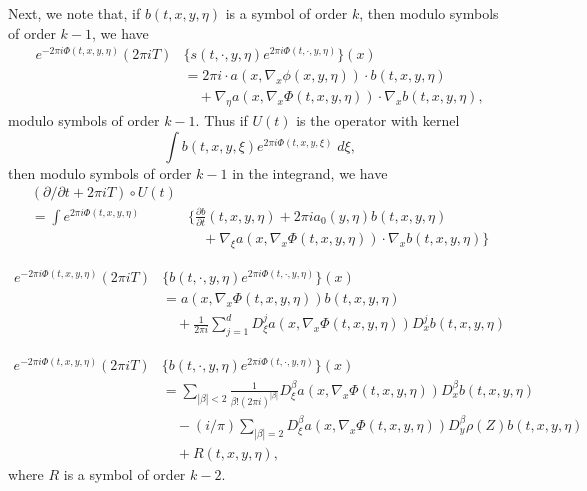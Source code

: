 Next, we note that, if $b(t,x,y,\eta)$ is a symbol of order $k$, then modulo symbols of order $k-1$, we have
%
\begin{align*}
    e^{-2 \pi i \Phi(t,x,y,\eta)} (2 \pi i T) & \{ s(t,\cdot,y,\eta) e^{2 \pi i \Phi(t,\cdot, y, \eta)} \}(x)\\
    &= 2 \pi i \cdot a(x, \nabla_x \phi(x,y,\eta)) \cdot b(t,x,y,\eta)\\
    &\quad + \nabla_\eta a(x, \nabla_x \Phi(t,x,y,\eta)) \cdot \nabla_x b(t,x,y,\eta),
\end{align*}
%
modulo symbols of order $k-1$. Thus if $U(t)$ is the operator with kernel
%
\[ \int b(t,x,y,\xi) e^{2 \pi i \Phi(t,x,y,\xi)}\; d\xi, \]
%
then modulo symbols of order $k-1$ in the integrand, we have
%
\begin{align*}
    (\partial / \partial t + 2 \pi i T) \circ U(t)\\
    = \int e^{2 \pi i \Phi(t,x,y,\eta)} & \Bigg\{ \frac{\partial b}{\partial t}(t,x,y,\eta) + 2 \pi i a_0(y,\eta) b(t,x,y,\eta)\\
    &\quad + \nabla_\xi a(x, \nabla_x \Phi(t,x,y,\eta)) \cdot \nabla_x b(t,x,y,\eta) \Bigg\}
\end{align*}

\newpage
%
\begin{align*}
    e^{-2 \pi i \Phi(t,x,y,\eta)} (2 \pi i T) & \{ b(t,\cdot,y,\eta) e^{2 \pi i \Phi(t,\cdot, y, \eta)} \}(x)\\
    &= a(x, \nabla_x \Phi(t,x,y,\eta)) b(t,x,y,\eta)\\
    &\quad + \frac{1}{2 \pi i} \sum_{j = 1}^d D^j_\xi a(x, \nabla_x \Phi(t,x,y,\eta)) D^j_x b(t,x,y,\eta)
\end{align*}


\begin{align*}
    e^{-2 \pi i \Phi(t,x,y,\eta)} (2 \pi i T) & \{ b(t,\cdot,y,\eta) e^{2 \pi i \Phi(t,\cdot, y, \eta)} \}(x)\\
    &= \sum_{|\beta| < 2} \frac{1}{\beta! (2 \pi i)^{|\beta|}} D^\beta_\xi a(x, \nabla_x \Phi(t,x,y,\eta)) D^\beta_x b(t,x,y,\eta)\\
    &\quad - (i/\pi) \sum_{|\beta| = 2} D^\beta_\xi a(x,\nabla_x \Phi(t,x,y,\eta)) D^\beta_y \rho(Z) b(t,x,y,\eta)\\
    &\quad + R(t,x,y,\eta),
\end{align*}
%
where $R$ is a symbol of order $k-2$.
















